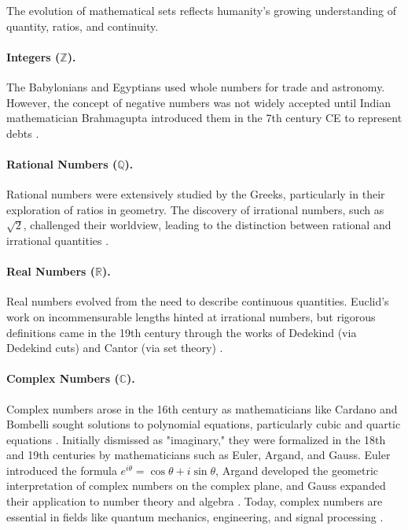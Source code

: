 The evolution of mathematical sets reflects humanity's growing understanding of quantity, ratios, and continuity.

\paragraph{Integers (\( \mathbb{Z} \)).}
The Babylonians and Egyptians used whole numbers for trade and astronomy. However, the concept of negative numbers was not widely accepted until Indian mathematician Brahmagupta introduced them in the 7th century CE to represent debts \cite{burton2010-number}. 

\paragraph{Rational Numbers (\( \mathbb{Q} \)).}
Rational numbers were extensively studied by the Greeks, particularly in their exploration of ratios in geometry. The discovery of irrational numbers, such as \( \sqrt{2} \), challenged their worldview, leading to the distinction between rational and irrational quantities \cite{maor2007}.

\paragraph{Real Numbers (\( \mathbb{R} \)).}
Real numbers evolved from the need to describe continuous quantities. Euclid's work on incommensurable lengths hinted at irrational numbers, but rigorous definitions came in the 19th century through the works of Dedekind (via Dedekind cuts) and Cantor (via set theory) \cite{rosen2018}.

\paragraph{Complex Numbers (\( \mathbb{C} \)).}
Complex numbers arose in the 16th century as mathematicians like Cardano and Bombelli sought solutions to polynomial equations, particularly cubic and quartic equations \cite{boyer1991history}. Initially dismissed as "imaginary," they were formalized in the 18th and 19th centuries by mathematicians such as Euler, Argand, and Gauss. Euler introduced the formula \( e^{i\theta} = \cos\theta + i\sin\theta \), Argand developed the geometric interpretation of complex numbers on the complex plane, and Gauss expanded their application to number theory and algebra \cite{kline1990mathematics, stewart2015-foundations}. Today, complex numbers are essential in fields like quantum mechanics, engineering, and signal processing \cite{maor2007}.


